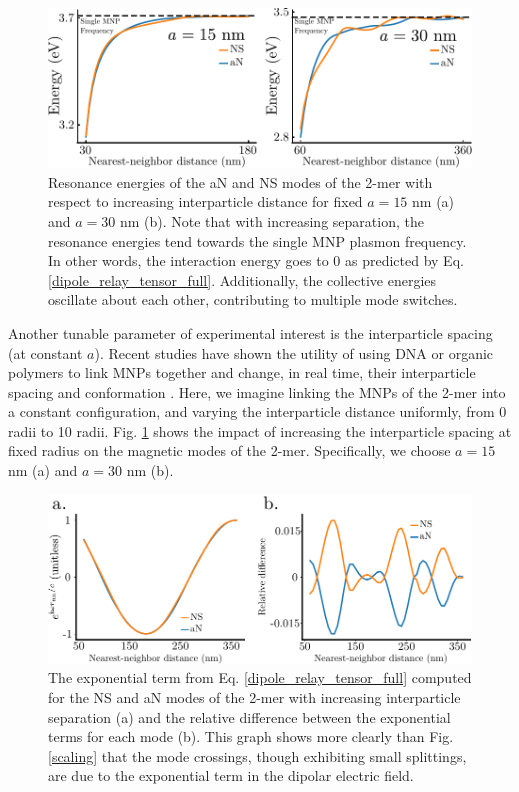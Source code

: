\documentclass [11pt, proquest] {uwthesis}[2016/11/22]
\begin{document}
\begin{figure}
\begin{centering}
\includegraphics{spacing_2mer.pdf}
\caption{Resonance energies of the aN and NS modes of the 2-mer with respect to increasing interparticle distance for fixed $a=15$ nm (a) and $a=30$ nm (b). Note that with increasing separation, the resonance energies tend towards the single MNP plasmon frequency. In other words, the interaction energy goes to 0 as predicted by Eq. \ref{dipole_relay_tensor_full}. Additionally, the collective energies oscillate about each other, contributing to multiple mode switches.}
\label{spacing_eig}
\end{centering}
\end{figure}


Another tunable parameter of experimental interest is the interparticle spacing (at constant $a$). Recent studies have shown the utility of using DNA or organic polymers to link MNPs together and change, in real time, their interparticle spacing and conformation \cite{DanLuo2009,NaLiu2017,Ginger2017}. Here, we imagine linking the MNPs of the 2-mer into a constant configuration, and varying the interparticle distance uniformly, from 0 radii to 10 radii. Fig. \ref{spacing_eig} shows the impact of increasing the interparticle spacing at fixed radius on the magnetic modes of the 2-mer. Specifically, we choose $a=15$ nm (a) and $a=30$ nm (b).


\begin{figure}
\begin{centering}
\includegraphics{diff_avg_space.pdf}
\caption{The exponential term from Eq. \ref{dipole_relay_tensor_full} computed for the NS and aN modes of the 2-mer with increasing interparticle separation (a) and the relative difference between the exponential terms for each mode (b). This graph shows more clearly than Fig. \ref{scaling} that the mode crossings, though exhibiting small splittings, are due to the exponential term in the dipolar electric field.}
\label{diff_avg_space}
\end{centering}
\end{figure}
\end{document}

